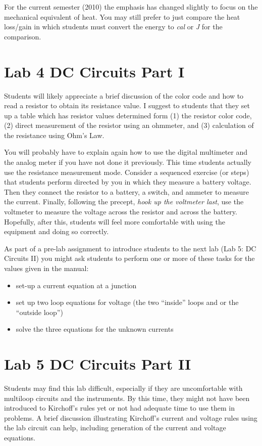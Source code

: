For the current semester (2010) the emphasis has changed slightly to focus on the mechanical equivalent of heat. You may still prefer to just compare the heat loss/gain in which students must convert the energy to \textsl{cal} or \textsl {J} for the comparison.

\section{Lab 4 DC Circuits Part I}
Students will likely appreciate a brief discussion of the color code and how to read a resistor to obtain its resistance value. I suggest to students that they set up a table which has resistor values determined form (1) the resistor color code, (2) direct measurement of the resistor using an ohmmeter, and (3) calculation of the resistance using Ohm's Law.

You will probably have to explain again how to use the digital multimeter and the analog meter if you have not done it previously. This time students actually use the resistance measurement mode. Consider a sequenced exercise (or steps) that students perform directed by you in which they measure a battery voltage. Then they connect the resistor to a battery, a switch, and ammeter to measure the current. Finally, following the precept,\textsl{ hook up the voltmeter last}, use the voltmeter to measure the voltage across the resistor and across the battery. Hopefully, after this, students will feel more comfortable with using the equipment and doing so correctly.

As part of a pre-lab assignment to introduce students to the next lab (Lab 5: DC Circuits II) you might ask students to perform one or more of these tasks for the values given in the manual:
\begin{itemize}
	\item set-up a current equation at a junction
	\item set up two loop equations for voltage (the two ``inside'' loops and or the ``outside loop'') 
	\item solve the three equations for the unknown currents
\end{itemize}

\section{Lab 5 DC Circuits Part II}
Students may find this lab difficult, especially if they are uncomfortable with multiloop circuits and the instruments. By this time, they might not have been introduced to Kirchoff's rules yet or not had adequate time to use them in problems. A brief discussion illustrating Kirchoff's current and voltage rules using the lab circuit can help, including generation of the current and voltage equations.

